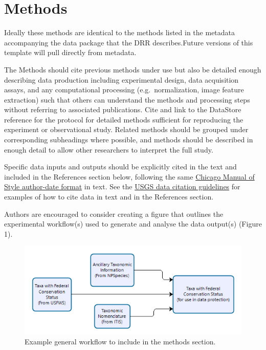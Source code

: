 \documentclass[
]{article}
\begin{document}
\hypertarget{methods}{%
\section{Methods}\label{methods}}

Ideally these methods are identical to the methods listed in the
metadata accompanying the data package that the DRR describes.Future
versions of this template will pull directly from metadata.

The Methods should cite previous methods under use but also be detailed
enough describing data production including experimental design, data
acquisition assays, and any computational processing
(e.g.~normalization, image feature extraction) such that others can
understand the methods and processing steps without referring to
associated publications. Cite and link to the DataStore reference for
the protocol for detailed methods sufficient for reproducing the
experiment or observational study. Related methods should be grouped
under corresponding subheadings where possible, and methods should be
described in enough detail to allow other researchers to interpret the
full study.

Specific data inputs and outputs should be explicitly cited in the text
and included in the References section below, following the same
\href{https://www.chicagomanualofstyle.org/tools_citationguide/citation-guide-2.html}{Chicago
Manual of Style author-date format} in text. See the
\href{https://www.usgs.gov/data-management/data-citation}{USGS data
citation guidelines} for examples of how to cite data in text and in the
References section.

Authors are encouraged to consider creating a figure that outlines the
experimental workflow(s) used to generate and analyse the data output(s)
(Figure 1).

\begin{figure}
\includegraphics[width=7.64in]{vignettes/common/ProcessingWorkflow} \caption{Example general workflow to include in the methods section.}\label{fig:figure1}
\end{figure}
\end{document}
